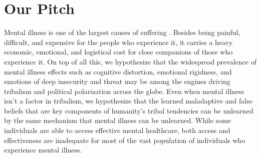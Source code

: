 \documentclass[12pt,letterpaper]{book}
\begin{document}
\section{Our Pitch}
Mental illness is one of the largest causes of suffering \cite{mentalhealthpriority}. Besides being painful, difficult, and expensive for the people who experience it, it carries a heavy economic, emotional, and logistical cost for close companions of those who experience it. On top of all this, we hypothesize that the widespread prevalence of mental illness effects such as cognitive distortion, emotional rigidness, and emotions of deep insecurity and threat may be among the engines driving tribalism and political polarization across the globe. Even when mental illness isn't a factor in tribalism, we hypothesize that the learned maladaptive and false beliefs that are key components of humanity's tribal tendencies \cite{klein2020Polarized,galefScoutMindset} can be unlearned by the same mechanism that mental illness can be unlearned. While some individuals are able to access effective mental healthcare, both access and effectiveness are inadequate for most of the vast population of individuals who experience mental illness.
\end{document}

